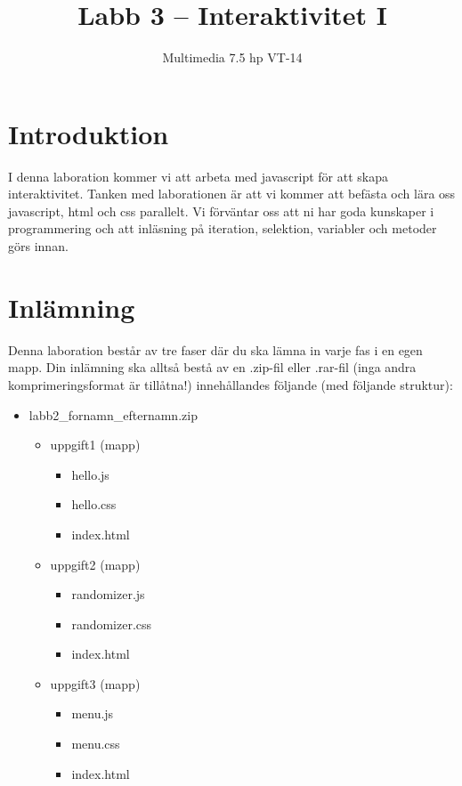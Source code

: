\documentclass[12pt]{article}
\date{}
\title{ Labb 3 -- Interaktivitet I }
\author{ Multimedia 7.5 hp VT-14 }
\begin{document}
\maketitle
\vspace{-2em}



\section{Introduktion}
I denna laboration kommer vi att arbeta med javascript för att skapa interaktivitet. Tanken med laborationen är att vi kommer att befästa och lära oss javascript, html och css parallelt. Vi förväntar oss att ni har goda kunskaper i programmering och att inläsning på iteration, selektion, variabler och metoder görs innan. 

\section{Inlämning}
Denna laboration består av tre faser där du ska lämna in varje fas i en egen mapp. Din inlämning ska alltså bestå av en .zip-fil eller .rar-fil (inga andra komprimeringsformat är tillåtna!) innehållandes följande (med följande struktur):
  \begin{itemize}
    \item labb2\_fornamn\_efternamn.zip

      \begin{itemize}
        \item uppgift1 (mapp)
          \begin{itemize}
            \item hello.js
            \item hello.css
            \item index.html
          \end{itemize}
        \item uppgift2 (mapp)
          \begin{itemize}
            \item randomizer.js
            \item randomizer.css
            \item index.html
          \end{itemize}
	      \item uppgift3 (mapp)
          \begin{itemize}
            \item menu.js
            \item menu.css
            \item index.html
          \end{itemize}
    \end{itemize}
  \end{itemize}
\end{document}
